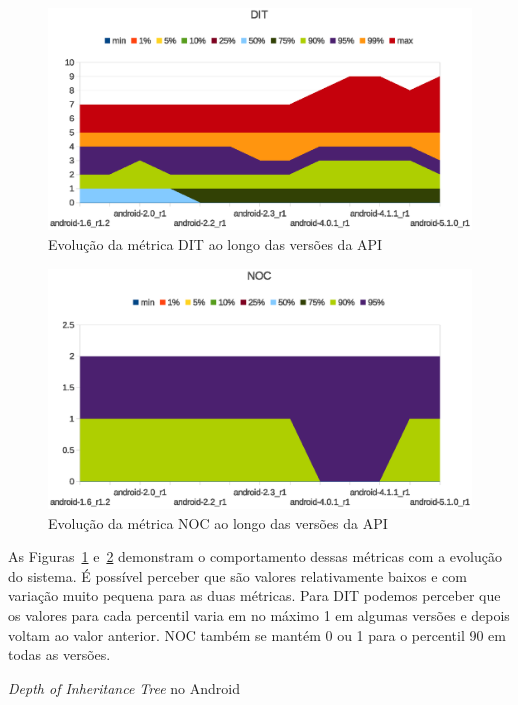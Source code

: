 \begin{figure}[!htb]
\centering
\includegraphics [keepaspectratio=true,scale=0.85]{figuras/graphs/dit_android.eps}
\caption{Evolução da métrica DIT ao longo das versões da API}
\label{fig:dit_android}
\end{figure}

\begin{figure}[!htb]
\centering
\includegraphics [keepaspectratio=true,scale=0.85]{figuras/graphs/noc_android.eps}
\caption{Evolução da métrica NOC ao longo das versões da API}
\label{fig:noc_android}
\end{figure}

As Figuras~\ref{fig:dit_android} e~\ref{fig:noc_android} demonstram o comportamento dessas métricas com a evolução do sistema. É possível perceber que são valores relativamente baixos e com variação muito pequena para as duas métricas. Para DIT podemos perceber que os valores para cada percentil varia em no máximo 1 em algumas versões e depois voltam ao valor anterior. NOC também se mantém 0 ou 1 para o percentil 90 em todas as versões.

\begin{table}[!htb]
\centering
{}

\caption{\textit{Depth of Inheritance Tree} no Android}
\label{tab:dit_android}
\end{table}

